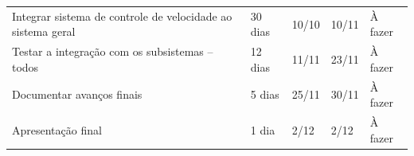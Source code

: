 \begin{table}[!htbp]
{\begin{tabular}{ l l l l l }
    \multicolumn{1}{|p{6.367cm}|}{Integrar sistema de controle de velocidade ao sistema geral} &
    \multicolumn{1}{p{1.750cm}|}{30 dias} &
    \multicolumn{1}{p{1.267cm}|}{10/10} &
    \multicolumn{1}{p{1.233cm}|}{10/11} &
    \multicolumn{1}{p{1.917cm}|}{À fazer}
  \\  
  \cline{1-1}\cline{2-2}\cline{3-3}\cline{4-4}\cline{5-5}  
    \multicolumn{1}{|p{6.367cm}|}{Testar a integração com os subsistemas – todos} &
    \multicolumn{1}{p{1.750cm}|}{12 dias} &
    \multicolumn{1}{p{1.267cm}|}{11/11} &
    \multicolumn{1}{p{1.233cm}|}{23/11} &
    \multicolumn{1}{p{1.917cm}|}{À fazer}
  \\  
  \cline{1-1}\cline{2-2}\cline{3-3}\cline{4-4}\cline{5-5}  
    \multicolumn{1}{|p{6.367cm}|}{Documentar avanços finais} &
    \multicolumn{1}{p{1.750cm}|}{5 dias} &
    \multicolumn{1}{p{1.267cm}|}{25/11} &
    \multicolumn{1}{p{1.233cm}|}{30/11} &
    \multicolumn{1}{p{1.917cm}|}{À fazer}
  \\  
  \cline{1-1}\cline{2-2}\cline{3-3}\cline{4-4}\cline{5-5}  
    \multicolumn{1}{|p{6.367cm}|}{Apresentação final} &
    \multicolumn{1}{p{1.750cm}|}{1 dia} &
    \multicolumn{1}{p{1.267cm}|}{2/12} &
    \multicolumn{1}{p{1.233cm}|}{2/12} &
    \multicolumn{1}{p{1.917cm}|}{À fazer}
  \\  
  \hline

 \end{tabular} }
\end{table}


							
